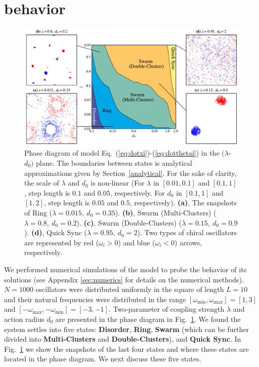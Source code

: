 \documentclass[%
 aip,
 amsmath,amssymb,
 reprint,%
]{revtex4-1}
\begin{document}
\section{behavior}

\begin{figure}
    \includegraphics[width=\textwidth]{./figs/phaseDiagram.pdf}
    \caption{
        \label{fig:phaseDiagram} Phase diagram of model Eq.~(\ref{eq:dotxi})-(\ref{eq:dotthetai}) in the $(\lambda$-$d_0)$ plane. The boundaries between states is 
        analytical approximations given by Section~\ref{analytical}. 
        For the sake of clarity, the scale of $\lambda$ and $d_0$ is non-linear (For $\lambda$ in $\left[ 0.01, 0.1 \right]$ and $\left[ 0.1, 1 \right]$, step length is $0.1$ and $0.05$, respectively. For $d_0$ in $\left[ 0.1, 1 \right]$ and $\left[ 1, 2 \right]$, step length is $0.05$ and $0.5$, respectively).
        \textbf{(a)}, The snapshots of Ring ($\lambda=0.015,\ d_0=0.35$). 
        \textbf{(b)}, Swarm (Multi-Clusters) ($\lambda=0.8,\ d_0=0.2$).
        \textbf{(c)}, Swarm (Double-Clusters) ($\lambda=0.15,\ d_0=0.9$).
        \textbf{(d)}, Quick Sync ($\lambda=0.95,\ d_0=2$). Two types of chiral oscillators are represented by red ($\omega_i > 0$) and blue 
        ($\omega_i < 0$) arrows, respectively. 
    }
\end{figure}

We performed numerical simulations of the model to probe the behavior of its solutions (see Appendix \ref{sec:numerics} for details on the numerical methods). 
$N=1000$ oscillators were distributed uniformly in the square of length $L=10$ and their natural frequencies were distributed in the range $\left[ \omega _{\min},\omega _{\max} \right]=\left[ 1,3 \right]$ and $\left[ -\omega _{\max},-\omega _{\min} \right]=\left[ -3,-1 \right]$.
Two-parameter of coupling strength $\lambda$ and action radius $d_0$ are presented in the phase diagram in Fig.~\ref{fig:phaseDiagram}. We found the system settles into five states: \textbf{Disorder}, \textbf{Ring}, \textbf{Swarm} (which can be further divided into \textbf{Multi-Clusters} and \textbf{Double-Clusters}), and \textbf{Quick Sync}. In Fig.~\ref{fig:phaseDiagram} we show the snapshots of the last four states and where these states are located in the phase diagram. We next discuss these five states.
\end{document}
